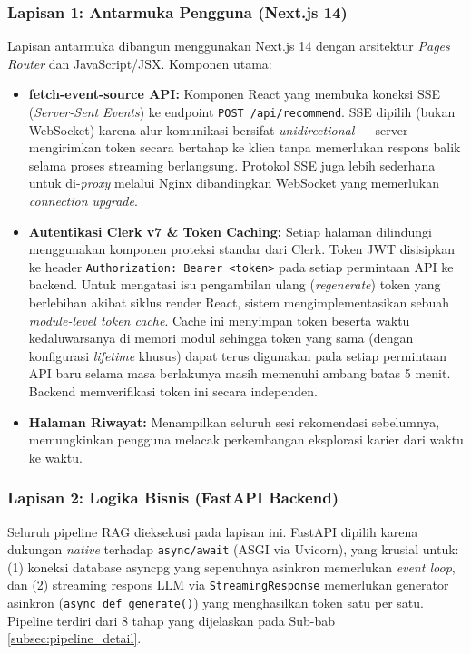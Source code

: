 \subsubsection{Lapisan 1: Antarmuka Pengguna (Next.js 14)}
Lapisan antarmuka dibangun menggunakan Next.js 14 dengan arsitektur \textit{Pages Router} dan JavaScript/JSX.
Komponen utama:
\begin{itemize}
  \item \textbf{fetch-event-source API:} Komponen React yang membuka koneksi SSE
    (\textit{Server-Sent Events}) ke endpoint \texttt{POST /api/recommend}.
    SSE dipilih (bukan WebSocket) karena alur komunikasi bersifat \textit{unidirectional} ---
    server mengirimkan token secara bertahap ke klien tanpa memerlukan respons balik
    selama proses streaming berlangsung. Protokol SSE juga lebih sederhana untuk
    di-\textit{proxy} melalui Nginx dibandingkan WebSocket yang memerlukan
    \textit{connection upgrade}.
  \item \textbf{Autentikasi Clerk v7 \& Token Caching:} Setiap halaman dilindungi menggunakan
    komponen proteksi standar dari Clerk. Token JWT disisipkan ke header
    \texttt{Authorization: Bearer <token>} pada setiap permintaan API ke backend.
    Untuk mengatasi isu pengambilan ulang (\textit{regenerate}) token yang berlebihan akibat siklus render React,
    sistem mengimplementasikan sebuah \textit{module-level token cache}. Cache ini menyimpan token 
    beserta waktu kedaluwarsanya di memori modul sehingga token yang sama (dengan konfigurasi \textit{lifetime} khusus)
    dapat terus digunakan pada setiap permintaan API baru selama masa berlakunya masih memenuhi ambang batas 5 menit.
    Backend memverifikasi token ini secara independen.
  \item \textbf{Halaman Riwayat:} Menampilkan seluruh sesi rekomendasi sebelumnya,
    memungkinkan pengguna melacak perkembangan eksplorasi karier dari waktu ke waktu.
\end{itemize}

\subsubsection{Lapisan 2: Logika Bisnis (FastAPI Backend)}
Seluruh pipeline RAG dieksekusi pada lapisan ini. FastAPI dipilih karena dukungan
\textit{native} terhadap \texttt{async/await} (ASGI via Uvicorn), yang krusial untuk:
(1) koneksi database asyncpg yang sepenuhnya asinkron memerlukan \textit{event loop}, dan
(2) streaming respons LLM via \texttt{StreamingResponse} memerlukan generator asinkron
(\texttt{async def generate()}) yang menghasilkan token satu per satu.
Pipeline terdiri dari 8 tahap yang dijelaskan pada Sub-bab \ref{subsec:pipeline_detail}.

